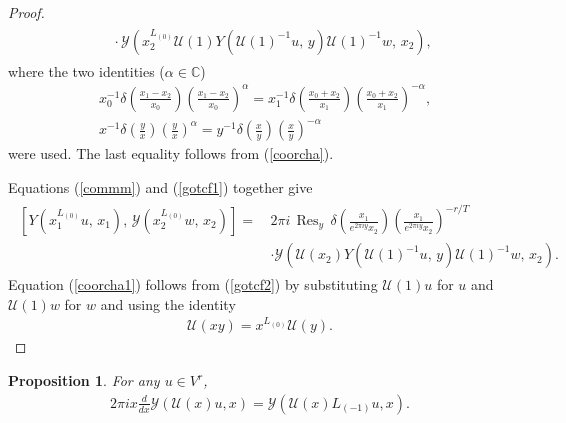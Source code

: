 \documentclass[9pt]{amsart}
\newtheorem{proposition}{Proposition}[section]
\begin{document}
\begin{proof}
\begin{align}
\begin{split}
       &\quad\cdot \mathcal{Y}\left(x_{2}^{L_{(0)}}\mathcal{U}(1)Y\left(\mathcal{U}(1)^{-1}u,\, y\right)\mathcal{U}(1)^{-1}w,\, x_{2}\right),
\end{split}
\end{align}
where the two identities ($\alpha\in \mathbb{C}$)
\begin{align*}
    & x_{0}^{-1}\delta\left(\frac{x_{1}-x_{2}}{x_{0}}\right)\left(\frac{x_{1}-x_{2}}{x_{0}}\right)^{\alpha}=x_{1}^{-1}\delta\left(\frac{x_{0}+x_{2}}{x_{1}}\right)\left(\frac{x_{0}+x_{2}}{x_{1}}\right)^{-\alpha}, \\
    & x^{-1}\delta\left(\frac{y}{x}\right)\left(\frac{y}{x}\right)^{\alpha}=y^{-1}\delta\left(\frac{x}{y}\right)\left(\frac{x}{y}\right)^{-\alpha}
\end{align*}
were used. The last equality follows from (\ref{coorcha}).

Equations (\ref{commm}) and (\ref{gotcf1}) together give
\begin{align}\label{gotcf2}
\begin{split}
\left[
Y\left(x_{1}^{L_{(0)}} u,\, x_{1} \right),\,
\mathcal{Y}\left(x_{2}^{L_{(0)}} w,\, x_{2} \right)
\right]
=\, & 2\pi i\, \operatorname{Res}_{y} \,
\delta\left( \frac{x_{1}}{e^{2\pi i y}x_{2}} \right)
\left( \frac{x_{1}}{e^{2\pi i y}x_{2}} \right)^{-r/T} \\
& \cdot \mathcal{Y}\left( 
\mathcal{U}(x_{2}) Y\left( \mathcal{U}(1)^{-1} u,\, y \right) 
\mathcal{U}(1)^{-1} w,\, x_{2} \right).
\end{split}
\end{align}
Equation (\ref{coorcha1}) follows from (\ref{gotcf2}) by substituting $\mathcal{U}(1)u$ for $u$ and $\mathcal{U}(1)w$ for $w$ and using the identity
\begin{align*}
    \mathcal{U}(xy)=x^{L_{(0)}}\mathcal{U}(y).
\end{align*}
\end{proof}

\begin{proposition}
For any $u \in V^{r}$,
\begin{align}\label{gotcf123}
    2\pi i x \frac{d}{dx} \mathcal{Y}(\mathcal{U}(x)u, x) = \mathcal{Y}(\mathcal{U}(x)L_{(-1)}u, x).
\end{align}
\end{proposition}
\end{document}
